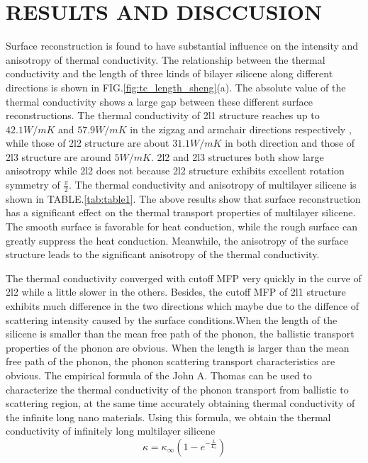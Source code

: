 \documentclass[%
 reprint,
 amsmath,amssymb,
 aps,
 prb,
]{revtex4-1}
\begin{document}
\section{RESULTS AND DISCCUSION}

Surface reconstruction is found to have substantial influence on the intensity and anisotropy of thermal conductivity. The relationship between the thermal conductivity  and the length of three kinds of bilayer silicene along different directions is shown in FIG.\ref{fig:tc_length_sheng}(a). The absolute value of the thermal conductivity shows a large gap between these different surface reconstructions. The thermal conductivity of 2l1 structure reaches up to $42.1W/mK$ and $57.9W/mK$ in the zigzag and armchair directions respectively , while those of 2l2 structure are about $31.1W/mK$ in both direction and those of 2l3 structure are around $5W/mK$. 2l2 and 2l3 structures both show large anisotropy while 2l2 does not because 2l2 structure exhibits excellent rotation symmetry of $\frac{\pi}{2}$. The thermal conductivity and anisotropy of multilayer silicene is shown in TABLE.\ref{tab:table1}.   The above results show that surface reconstruction has a significant effect on the thermal transport properties of multilayer silicene. The smooth surface is favorable for heat conduction, while the rough surface can greatly suppress the heat conduction. Meanwhile, the anisotropy of the surface structure leads to the significant anisotropy of the thermal conductivity.


The thermal conductivity converged with cutoff MFP very quickly in the curve of 2l2 while a little slower in the others. Besides, the cutoff MFP of 2l1 structure exhibits much difference in the two directions  which maybe due to the diffence of scattering intensity caused by the surface conditions.When the length of the silicene is smaller than the mean free path of the phonon, the ballistic transport properties of the phonon are obvious. When the length is larger than the mean free path of the phonon, the phonon scattering transport characteristics are obvious. The empirical formula of the John A. Thomas\cite{Thomas2010} can be used to characterize the thermal conductivity of the phonon transport from ballistic to scattering region, at the same time accurately obtaining thermal conductivity of the infinite long nano materials. Using this formula, we obtain the thermal conductivity of infinitely long multilayer silicene
\begin{equation}
  \kappa = \kappa_\infty (1-e^{-\frac{L}{L_c}}) \label{eq:eq_nemd}
\end{equation}
\end{document}
